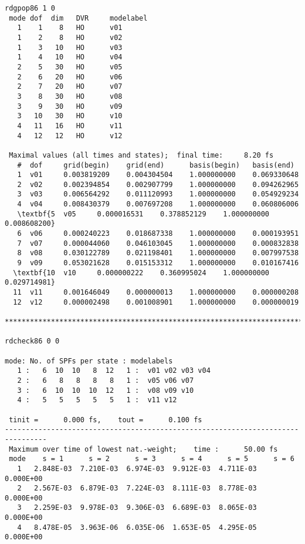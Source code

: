 \documentclass[letterpaper, 12pt, oneside]{report}
\begin{document}
\begin{lstlisting}
rdgpop86 1 0
 mode dof  dim   DVR     modelabel
   1    1    8   HO      v01
   1    2    8   HO      v02
   1    3   10   HO      v03
   1    4   10   HO      v04
   2    5   30   HO      v05
   2    6   20   HO      v06
   2    7   20   HO      v07
   3    8   30   HO      v08
   3    9   30   HO      v09
   3   10   30   HO      v10
   4   11   16   HO      v11
   4   12   12   HO      v12

 Maximal values (all times and states);  final time:     8.20 fs
   #  dof     grid(begin)    grid(end)      basis(begin)   basis(end)
   1  v01     0.003819209    0.004304504    1.000000000    0.069330648
   2  v02     0.002394854    0.002907799    1.000000000    0.094262965
   3  v03     0.006564292    0.011120993    1.000000000    0.054929234
   4  v04     0.008430379    0.007697208    1.000000000    0.060806006
   \textbf{5  v05     0.000016531    0.378852129    1.000000000    0.008608200}
   6  v06     0.000240223    0.018687338    1.000000000    0.000193951
   7  v07     0.000044060    0.046103045    1.000000000    0.000832838
   8  v08     0.030122789    0.021198401    1.000000000    0.007997538
   9  v09     0.053021628    0.015153312    1.000000000    0.010167416
  \textbf{10  v10     0.000000222    0.360995024    1.000000000    0.029714981}
  11  v11     0.001646049    0.000000013    1.000000000    0.000000208
  12  v12     0.000002498    0.001008901    1.000000000    0.000000019

******************************************************************************

rdcheck86 0 0

mode: No. of SPFs per state : modelabels
   1 :   6  10  10   8  12   1 :  v01 v02 v03 v04
   2 :   6   8   8   8   8   1 :  v05 v06 v07
   3 :   6  10  10  10  12   1 :  v08 v09 v10
   4 :   5   5   5   5   5   1 :  v11 v12

 tinit =      0.000 fs,    tout =      0.100 fs
--------------------------------------------------------------------------------
 Maximum over time of lowest nat.-weight;    time :      50.00 fs
 mode    s = 1      s = 2      s = 3      s = 4      s = 5      s = 6
   1   2.848E-03  7.210E-03  6.974E-03  9.912E-03  4.711E-03  0.000E+00
   2   2.567E-03  6.879E-03  7.224E-03  8.111E-03  8.778E-03  0.000E+00
   3   2.259E-03  9.978E-03  9.306E-03  6.689E-03  8.065E-03  0.000E+00
   4   8.478E-05  3.963E-06  6.035E-06  1.653E-05  4.295E-05  0.000E+00

\end{lstlisting}
\end{document}
